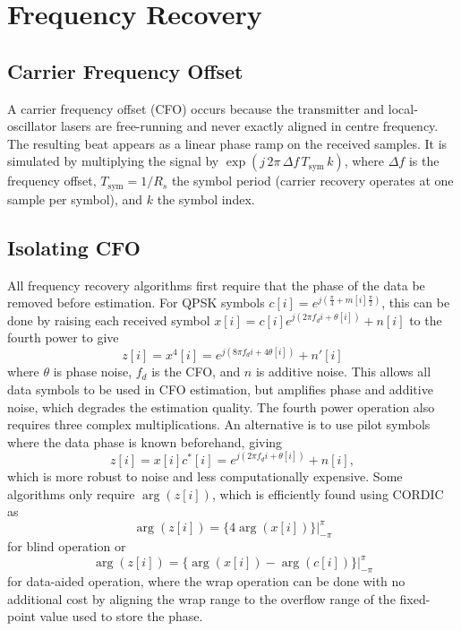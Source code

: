 \documentclass[12pt,a4paper]{report}
\begin{document}
\section{Frequency Recovery}
\subsection{Carrier Frequency Offset}
A carrier frequency offset (CFO) occurs because the transmitter and local-oscillator lasers are free-running and never exactly aligned in centre frequency. The resulting beat appears as a linear phase ramp on the received samples. It is simulated by multiplying the signal by \(\exp(j\,2\pi\,\Delta f\, T_\mathrm{sym}\, k)\), where \(\Delta f\) is the frequency offset, \(T_\mathrm{sym} = 1/R_s\) the symbol period (carrier recovery operates at one sample per symbol), and \(k\) the symbol index.

\subsection{Isolating CFO}
All frequency recovery algorithms first require that the phase of the data be removed before estimation. For QPSK symbols \(c[i] = e^{j\left(\frac{\pi}{4} + m[i]\frac{\pi}{2}\right)}\), this can be done by raising each received symbol \(x[i] = c[i]e^{j(2\pi f_d i + \theta[i])} + n[i]\) to the fourth power to give
\begin{equation}
    z[i] = x^4[i] = e^{j(8\pi f_d i + 4 \theta[i])} + n'[i]
    \label{eq:blind_noise}
\end{equation}
where \(\theta\) is phase noise, \(f_d\) is the CFO, and \(n\) is additive noise. This allows all data symbols to be used in CFO estimation, but amplifies phase and additive noise, which degrades the estimation quality. The fourth power operation also requires three complex multiplications. An alternative is to use pilot symbols where the data phase is known beforehand, giving
\begin{equation}
    z[i] = x[i]c^*[i] = e^{j(2\pi f_d i + \theta[i])} + n[i],
    \label{eq:data_noise}
\end{equation}
which is more robust to noise and less computationally expensive. Some algorithms only require \(\arg(z[i])\), which is efficiently found using CORDIC as
\begin{equation}
    \arg(z[i]) = \{4\arg(x[i])\}|_{-\pi}^\pi
    \label{eq:phase_blind}
\end{equation}
for blind operation or
\begin{equation}
    \arg(z[i]) = \{\arg(x[i]) - \arg(c[i])\}|_{-\pi}^{\pi}
    \label{eq:phase_data}
\end{equation}
for data-aided operation, where the wrap operation can be done with no additional cost by aligning the wrap range to the overflow range of the fixed-point value used to store the phase.
\end{document}
